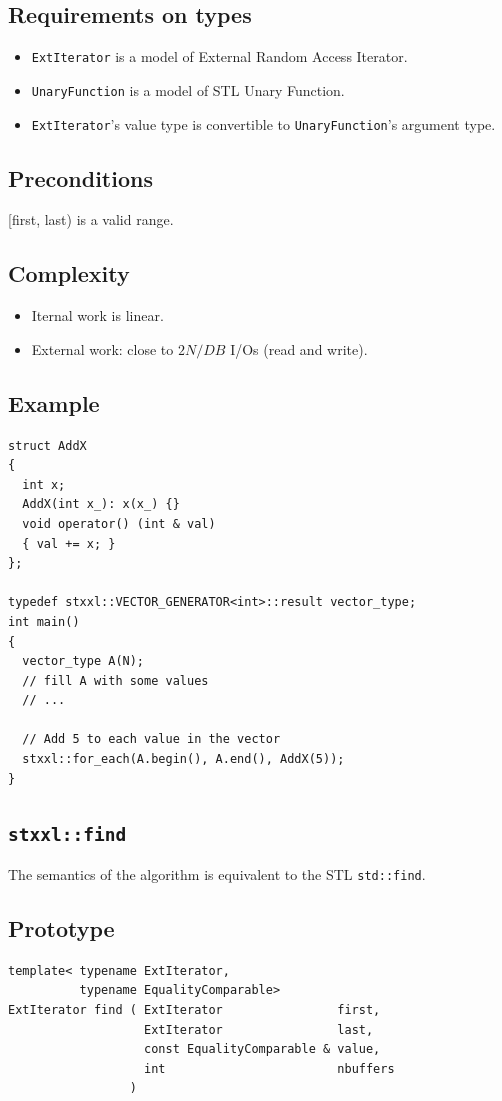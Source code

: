 \documentclass[twoside]{book}
\begin{document}
\subsection*{Requirements on types}
\begin{itemize}
\item \texttt{ExtIterator} is a model of External Random Access
Iterator.
\item \texttt{UnaryFunction} is a model of STL Unary Function.
\item \texttt{ExtIterator}'s value type is convertible to
\texttt{UnaryFunction}'s argument type.
\end{itemize}
\subsection*{Preconditions}
[first, last) is a valid range.
\subsection*{Complexity}
\begin{itemize}
\item Iternal work is linear.
\item External work: close to $2N/DB$ I/Os (read and write).
\end{itemize}

\subsection*{Example}
\begin{lstlisting}
struct AddX
{
  int x;
  AddX(int x_): x(x_) {}
  void operator() (int & val)
  { val += x; }
};

typedef stxxl::VECTOR_GENERATOR<int>::result vector_type;
int main()
{
  vector_type A(N);
  // fill A with some values
  // ...  

  // Add 5 to each value in the vector
  stxxl::for_each(A.begin(), A.end(), AddX(5));
}
\end{lstlisting}
\subsection{\texttt{stxxl::find}}
\label{generate}
The semantics of the algorithm is equivalent to the STL
\texttt{std::find}.

\subsection*{Prototype}
\begin{lstlisting}
template< typename ExtIterator, 
          typename EqualityComparable>
ExtIterator find ( ExtIterator                first,
                   ExtIterator                last,
                   const EqualityComparable & value,
                   int                        nbuffers
                 )  
\end{lstlisting}
\end{document}
